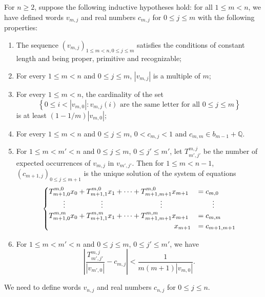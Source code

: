 \documentclass{amsart}
\theoremstyle{definition}
\theoremstyle{problem}
\theoremstyle{remark}
\numberwithin{equation}{section}
\begin{document}
For $ n\ge2$, suppose the following inductive hypotheses hold: for all $1\le m< n$, we have defined words $v_{m,j}$ and real numbers $c_{m,j}$ for $0\le j\le m$ with the following properties:
\begin{enumerate}
\item[(1)] The sequence $(v_{m,j})_{1\leq m<n, 0\leq j\leq m}$ satisfies the conditions of constant length and being proper,  primitive and recognizable; 
\item[(2)] For every $1\le m< n$ and $0\leq j\leq m$, $|v_{m,j}|$ is a multiple of $m$; 
\item[(3)] For every $1\le m< n$, the cardinality of the set 
$$\left\{ 0\le i <|v_{m,0}| \colon v_{m,j}(i) \mbox{ are the same letter for all } 0\le j\le m\right\}$$
is at least $(1-1/m)|v_{m,0}|$;


\item[(4)] For every $1\le m< n$ and $0\le j\le m$, $0< c_{m,j}<1$ and $c_{m,m}\in  b_{m-1}+\mathbb{Q}$.
\item[(5)] For $1\le m< m'<n$ and $0\le j\leq m$, $0\leq  j'\le m'$,  let $T^{m,j}_{m',j'}$ be the number of expected occurrences of $v_{m,j}$ in $v_{m',j'}$. Then for $1\leq m<n-1$, $(c_{m+1,j})_{0\le j\le m+1}$ is the unique solution of the system of equations 
\begin{equation*}
\begin{cases}
T^{m,0}_{m+1,0}x_0+T^{m,0}_{m+1,1}x_1+\dots+T^{m,0}_{m+1,m+1}x_{m+1}&=c_{m,0}\\
 \hspace{2em}\vdots\hspace{5em}\vdots \hspace{8em}\vdots&\hspace{2em}\vdots\\
T^{m,m}_{m+1,0}x_0+T^{m,m}_{m+1,1}x_1+\dots+T^{m,m}_{m+1,m+1}x_{m+1}&=c_{m,m}\\
 \hspace{17.5em}  x_{m+1}&=c_{m+1,m+1}
\end{cases}
\end{equation*}
\item[(6)] For $1\le m< m'<n$ and $0\le j\le m$, $0\le  j'\le m'$, we have
$$\left|\frac{T^{m,j}_{m',j'}}{|v_{m',0}|}-c_{m,j}\right|<\frac{1}{m(m+1)|v_{m,0}|}. $$
\end{enumerate}
We need to define words $v_{n,j}$ and real numbers $c_{n,j}$ for $0\le j\le n$. 
\end{document}
